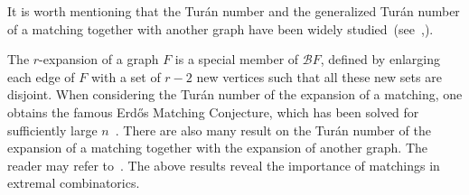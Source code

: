 \documentclass[11pt]{article}
\numberwithin{equation}{section}
\newtheorem{thm}{Theorem}[section]
\newcounter{cases}
\begin{document}
It is worth mentioning that the Tur\'{a}n number and the generalized Tur\'{a}n number of a matching together with another graph have been widely studied~(see~\cite{ALON2024223,Gerbner2024matching, 2023arXiv230105625M},\cite{Zhu}).

The $r$-expansion of a graph $F$ is a special member of $\mathcal{B}F$, defined by enlarging each edge of $F$ with a set of $r-2$ new vertices such that all these new sets are disjoint.
When considering the Tur\'{a}n number of the expansion of a matching, one obtains the famous Erd\H{o}s Matching Conjecture, which has been solved for sufficiently large $n$~\cite{FRANKL20131068}.
There are also many result on the Tur\'{a}n number of the expansion of a matching together with the expansion of another graph.
The reader may refer to~\cite{GERBNER2025104155, 2025arXiv250704579W, 2025arXiv251121096Y, 2025arXiv251117000C, zhou2026linear}.
The above results reveal the importance of matchings in extremal combinatorics.





\end{document}
